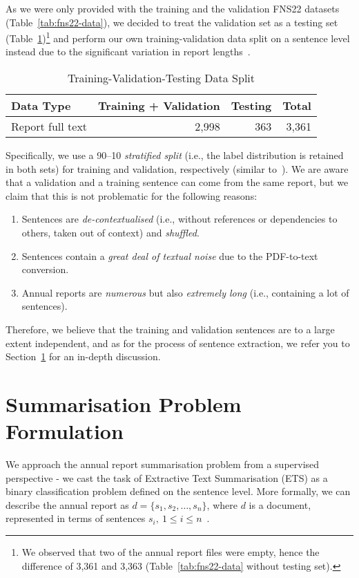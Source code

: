As we were only provided with the training and the validation FNS22 datasets (Table~\ref{tab:fns22-data}),
we decided to treat the validation set as a testing set (Table~\ref{tab:fns22-my-data})\footnote{
    We observed that two of the annual report files were empty, hence the difference of 3,361 and 3,363 (Table~\ref{tab:fns22-data} without testing set).
} and perform our own training-validation data split on a sentence level instead due to the significant variation in report lengths~\cite{litvak-vanetik-2021-summarization}.
\begin{table}[h]
    \centering
    \begin{tabular}{lrr r}
        \hline
        Data Type & Training + Validation & Testing & Total \\
        \midrule
        Report full text & 2,998 & 363 & 3,361 \\
        \bottomrule
    \end{tabular}
    \caption{Training-Validation-Testing Data Split}
    \label{tab:fns22-my-data}
\end{table}
Specifically, we use a 90--10 \emph{stratified split} (i.e., the label distribution is retained in both sets) for training and validation, respectively (similar to~\cite{stepisnik-perdih-etal-2022-sentiment}).
We are aware that a validation and a training sentence can come from the same report, but we claim that this is not problematic for the following reasons:
\begin{enumerate}
    \item Sentences are \emph{de-contextualised} (i.e., without references or dependencies to others, taken out of context) and \emph{shuffled}.
    \item Sentences contain a \emph{great deal of textual noise} due to the PDF-to-text conversion.
    \item Annual reports are \emph{numerous} but also \emph{extremely long} (i.e., containing a lot of sentences).
\end{enumerate}
Therefore, we believe that the training and validation sentences are to a large extent independent, and as for the process of sentence extraction, we refer you to Section~\ref{sec:sentence_extraction} for an in-depth discussion.

\section{Summarisation Problem Formulation}\label{sec:sentence_extraction}
We approach the annual report summarisation problem from a supervised perspective - we cast the task of Extractive Text Summarisation (ETS) as a binary classification problem defined on the sentence level.
More formally, we can describe the annual report as $d=\{s_{1}, s_{2}, \dots, s_{n}\}$, where $d$ is a document, represented in terms of sentences $s_{i}, \  1 \leq i \leq n$~\cite{liu2019finetuningbert}.

